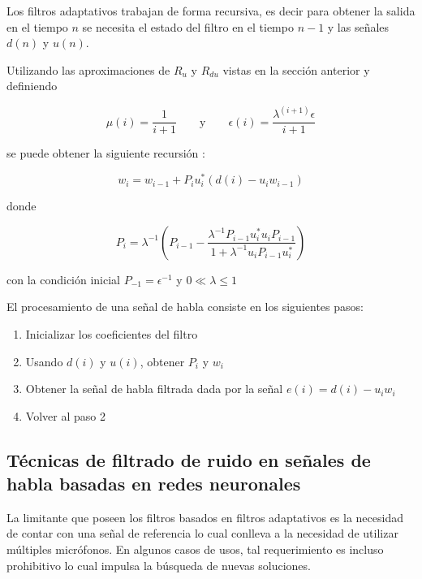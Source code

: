 Los filtros adaptativos trabajan de forma recursiva, es decir para obtener la salida en el tiempo $n$ se necesita el estado del filtro en el tiempo $n-1$ y las señales $d(n)$ y $u(n)$. 

Utilizando las aproximaciones de $R_u$ y $R_{du}$ vistas en la sección anterior y definiendo

\begin{equation*}
	\mu(i) = \frac{1}{i+1} \qquad \text{y} \qquad \epsilon(i) = \frac{\lambda^(i+1) \epsilon}{i + 1}
\end{equation*}

se puede obtener la siguiente recursión \cite{fundamentals_of_adaptive_filtering}:

\begin{equation*}
	w_i = w_{i-1} + P_i u_i^* \left( d(i) - u_i w_{i-1} \right)
\end{equation*}

donde

\begin{equation*}
	P_i = \lambda^{-1} \left(P_{i-1} - \frac{\lambda^{-1} P_{i-1} u_i^* u_i P_{i-1}}{1 + \lambda^{-1} u_i P_{i-1} u_i^*} \right)
\end{equation*}

con la condición inicial $P_{-1}=\epsilon^{-1}$ y $ 0 \ll \lambda \le 1$

El procesamiento de una señal de habla consiste en los siguientes pasos:

\begin{enumerate}
	\item Inicializar los coeficientes del filtro
	\item Usando $d(i)$ y $u(i)$, obtener $P_i$ y $w_i$
	\item Obtener la señal de habla filtrada dada por la señal $e(i) = d(i) - u_i w_i $
	\item Volver al paso 2
\end{enumerate}

\subsection{Técnicas de filtrado de ruido en señales de habla basadas en redes neuronales}
\label{sec:tecnicas_filtrado_redes_neuronales}

La limitante que poseen los filtros basados en filtros adaptativos es la necesidad de contar con una señal de referencia lo cual conlleva a la necesidad de utilizar múltiples micrófonos. En algunos casos de usos, tal requerimiento es incluso prohibitivo lo cual impulsa la búsqueda de nuevas soluciones. 

